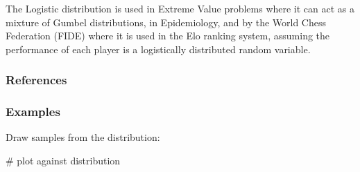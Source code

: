 \documentclass[letterpaper,10pt,english]{sphinxmanual}
\begin{document}
\begin{fulllineitems}
\sphinxAtStartPar
The Logistic distribution is used in Extreme Value problems where it
can act as a mixture of Gumbel distributions, in Epidemiology, and by
the World Chess Federation (FIDE) where it is used in the Elo ranking
system, assuming the performance of each player is a logistically
distributed random variable.
\subsubsection*{References}
\subsubsection*{Examples}

\sphinxAtStartPar
Draw samples from the distribution:

\begin{sphinxVerbatim}[commandchars=\\\{\}]
    
    
   
     
\end{sphinxVerbatim}

\sphinxAtStartPar
\#   plot against distribution

\begin{sphinxVerbatim}[commandchars=\\\{\}]
   
     
    
     
\end{sphinxVerbatim}

\end{fulllineitems}
\end{document}
